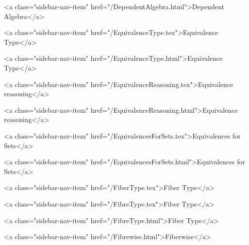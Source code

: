       
    
      
        
          <a class="sidebar-nav-item" href="/DependentAlgebra.html">Dependent Algebra</a>
        
      
    
      
        
          <a class="sidebar-nav-item" href="/EquivalenceType.tex">Equivalence Type</a>
        
      
    
      
        
          <a class="sidebar-nav-item" href="/EquivalenceType.html">Equivalence Type</a>
        
      
    
      
        
          <a class="sidebar-nav-item" href="/EquivalenceReasoning.tex">Equivalence reasoning</a>
        
      
    
      
        
          <a class="sidebar-nav-item" href="/EquivalenceReasoning.html">Equivalence reasoning</a>
        
      
    
      
        
          <a class="sidebar-nav-item" href="/EquivalencesForSets.tex">Equivalences for Sets</a>
        
      
    
      
        
          <a class="sidebar-nav-item" href="/EquivalencesForSets.html">Equivalences for Sets</a>
        
      
    
      
        
          <a class="sidebar-nav-item" href="/FiberType.tex">Fiber Type</a>
        
      
    
      
        
          <a class="sidebar-nav-item" href="/FibreType.tex">Fiber Type</a>
        
      
    
      
        
          <a class="sidebar-nav-item" href="/FibreType.html">Fiber Type</a>
        
      
    
      
        
          <a class="sidebar-nav-item" href="/Fibrewise.html">Fiberwise</a>
        
